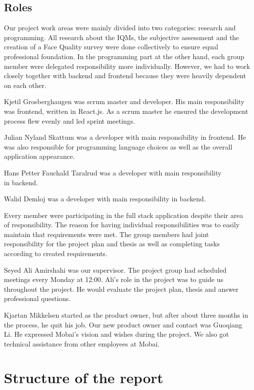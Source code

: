 \subsection{Roles}
Our project work areas were mainly divided into two categories: research and programming. All research about the IQMs, the subjective assessment and the creation of a Face Quality survey were done collectively to ensure equal professional foundation. In the programming part at the other hand, each group member were delegated responsibility more individually. However, we had to work closely together with backend and frontend because they were heavily dependent on each other.  

Kjetil Grosberghaugen was scrum master and developer. His main responsibility was frontend, written in React.js. As a scrum master he ensured the development process flew evenly and led sprint meetings. 

Julian Nyland Skattum was a developer with main responsibility in frontend. He was also responsible for programming language choices as well as the overall application appearance. 

Hans Petter Fauchald Taralrud was a developer with main responsibility\\ in backend. 

Walid Demloj was a developer with main responsibility in backend. 

Every member were participating in the full stack application despite their area of responsibility. The reason for having individual responsibilities was to easily maintain that requirements were met. The group members had joint responsibility for the project plan and thesis as well as completing tasks according to created requirements. 

Seyed Ali Amirshahi was our supervisor. The project group had scheduled meetings every Monday at 12:00. Ali's role in the project was to guide us throughout the project. He would evaluate the project plan, thesis and answer professional questions. 

Kjartan Mikkelsen started as the product owner, but after about three months in the process, he quit his job. Our new product owner and contact was Guoqiang Li. He expressed Mobai's vision and wishes during the project.  We also got technical assistance from other employees at Mobai. 

\section{Structure of the report}
